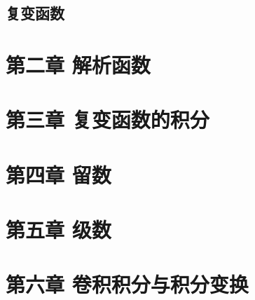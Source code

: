 \documentclass{beamer}
\begin{document}

\subsection{复变函数}

\section{第二章 \quad 解析函数}

\section{第三章 \quad  复变函数的积分}

\section{第四章 \quad 留数}

\section{第五章 \quad 级数}

\section{第六章 \quad 卷积积分与积分变换}

\end{document}
